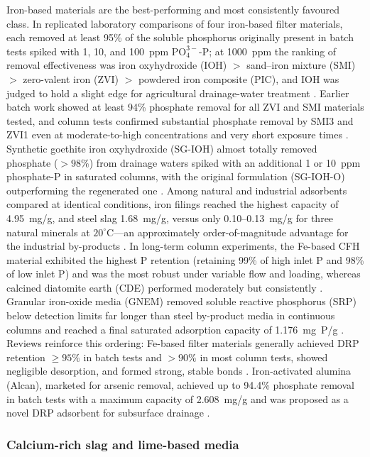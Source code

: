 Iron-based materials are the best-performing and most consistently favoured
class. In replicated laboratory comparisons of four iron-based filter materials,
each removed at least 95\% of the soluble phosphorus originally present in
batch tests spiked with 1, 10, and 100~ppm $\mathrm{PO_4^{3-}}$-P; at 1000~ppm the
ranking of removal effectiveness was iron oxyhydroxide (IOH) $>$ sand--iron
mixture (SMI) $>$ zero-valent iron (ZVI) $>$ powdered iron composite (PIC), and
IOH was judged to hold a slight edge for agricultural drainage-water treatment
\parencite{Allred2014}. Earlier batch work showed at least 94\% phosphate removal
for all ZVI and SMI materials tested, and column tests confirmed substantial
phosphate removal by SMI3 and ZVI1 even at moderate-to-high concentrations and
very short exposure times \parencite{Allred2012}. Synthetic goethite iron
oxyhydroxide (SG-IOH) almost totally removed phosphate ($>98\%$) from drainage
waters spiked with an additional 1 or 10~ppm phosphate-P in saturated columns,
with the original formulation (SG-IOH-O) outperforming the regenerated one
\parencite{Allred2017}. Among natural and industrial adsorbents compared at
identical conditions, iron filings reached the highest capacity of 4.95~mg/g,
and steel slag 1.68~mg/g, versus only 0.10--0.13~mg/g for three natural minerals
at $20^{\circ}$C---an approximately order-of-magnitude advantage for the
industrial by-products \parencite{Sellner2019b}. In long-term column experiments,
the Fe-based CFH material exhibited the highest P retention (retaining 99\% of
high inlet P and 98\% of low inlet P) and was the most robust under variable flow
and loading, whereas calcined diatomite earth (CDE) performed moderately but
consistently \parencite{Pugliese2023}. Granular iron-oxide media (GNEM) removed
soluble reactive phosphorus (SRP) below detection limits far longer than steel
by-product media in continuous columns and reached a final saturated adsorption
capacity of 1.176~mg~P/g \parencite{Hauda2020}. Reviews reinforce this ordering:
Fe-based filter materials generally achieved DRP retention $\geq 95\%$ in batch
tests and $>90\%$ in most column tests, showed negligible desorption, and formed
strong, stable bonds \parencite{Mendes2022}. Iron-activated alumina (Alcan),
marketed for arsenic removal, achieved up to 94.4\% phosphate removal in batch
tests with a maximum capacity of 2.608~mg/g and was proposed as a novel DRP
adsorbent for subsurface drainage \parencite{Kumari2025}.

\subsubsection{Calcium-rich slag and lime-based media}

